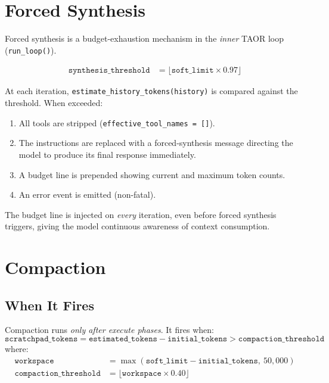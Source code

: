 \documentclass[11pt,letterpaper]{report}
\newcommand{\code}[1]{\texttt{#1}}
\begin{document}
\section{Forced Synthesis}
\label{sec:forced-synthesis}

Forced synthesis is a budget-exhaustion mechanism in the \emph{inner}
TAOR loop (\code{run\_loop()}).

\begin{align*}
\texttt{synthesis\_threshold} &= \lfloor \texttt{soft\_limit} \times 0.97 \rfloor
\end{align*}

At each iteration, \code{estimate\_history\_tokens(history)} is
compared against the threshold. When exceeded:

\begin{enumerate}[nosep]
  \item All tools are stripped (\code{effective\_tool\_names = []}).
  \item The instructions are replaced with a forced-synthesis message
        directing the model to produce its final response immediately.
  \item A budget line is prepended showing current and maximum token
        counts.
  \item An error event is emitted (non-fatal).
\end{enumerate}

The budget line is injected on \emph{every} iteration,
even before forced synthesis triggers, giving the model continuous
awareness of context consumption.


\section{Compaction}
\label{sec:compaction}

\subsection{When It Fires}

Compaction runs \emph{only after execute phases}.
It fires when:
\[
\texttt{scratchpad\_tokens} = \texttt{estimated\_tokens} - \texttt{initial\_tokens} > \texttt{compaction\_threshold}
\]
where:
\begin{align*}
\texttt{workspace} &= \max(\texttt{soft\_limit} - \texttt{initial\_tokens},\ 50{,}000) \\
\texttt{compaction\_threshold} &= \lfloor \texttt{workspace} \times 0.40 \rfloor
\end{align*}
\end{document}
